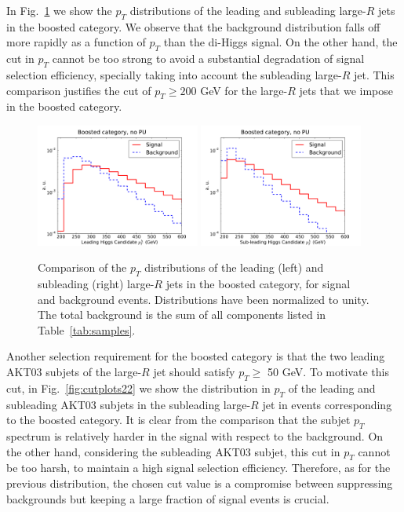In Fig.~\ref{fig:cutplots1} we show
the $p_T$ distributions
of the
  leading and subleading large-$R$ jets in the boosted category.
  We observe that the background distribution
falls off more rapidly as a function of $p_T$ than the di-Higgs signal.
  On the other hand, the cut in $p_T$ cannot be too strong to avoid
  a substantial degradation of signal selection efficiency,
  specially taking into account the subleading large-$R$ jet.
  This comparison justifies the cut of $p_T \ge 200$ GeV
  for the large-$R$ jets that we impose in the boosted category.
  

\begin{figure}[t]
\begin{center}
 \includegraphics[width=0.48\textwidth]{plots/pt_H0_bst_C1d_noPU.pdf}
 \includegraphics[width=0.48\textwidth]{plots/pt_H1_bst_C1d_noPU.pdf}
\caption{\small  Comparison of the $p_T$ distributions of the
  leading (left) and
  subleading (right) large-$R$ jets in the boosted category,
  for signal and background events.
  Distributions have been normalized to unity.
  The total background is the sum of all components
  listed in Table~\ref{tab:samples}.
}
\label{fig:cutplots1}
\end{center}
\end{figure}


Another selection requirement for the boosted category is that the two
leading AKT03 subjets of the large-$R$ jet
should satisfy $p_T \ge $ 50 GeV.
%
To motivate this cut, in Fig.~\ref{fig:cutplots22}
we show the distribution in $p_T$ of the leading
and subleading AKT03 subjets in the subleading large-$R$ jet in events
corresponding to the boosted category.
%
It is clear from the comparison that the subjet $p_T$ spectrum is
relatively harder in the signal with respect to the background.
%
On the other hand, considering the subleading AKT03 subjet,
this cut in $p_T$
cannot be too harsh, to maintain a high signal selection
efficiency.
%
Therefore,
as for the previous distribution, the chosen cut value is
a compromise between suppressing backgrounds but keeping a large fraction of
signal events is crucial.


